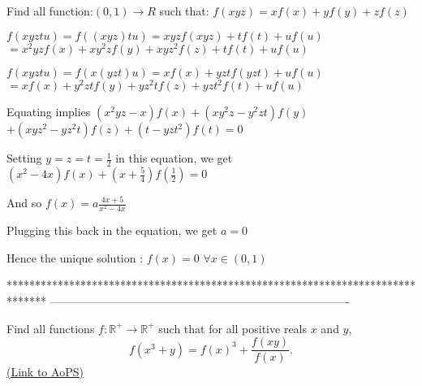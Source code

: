 \begin{solution}
	\begin{tcolorbox}Find all function:$ (0,1) \to R$ such that:
$ f(xyz) = xf(x) + yf(y) + zf(z)$\end{tcolorbox}

$ f(xyztu)=f((xyz)tu)=xyzf(xyz)+tf(t)+uf(u)$ $ =x^2yzf(x)+xy^2zf(y)+xyz^2f(z)+tf(t)+uf(u)$

$ f(xyztu)=f(x(yzt)u)=xf(x)+yztf(yzt)+uf(u)$ $ =xf(x)+y^2ztf(y)+yz^2tf(z)+yzt^2f(t)+uf(u)$

Equating implies $ (x^2yz-x)f(x)+(xy^2z-y^2zt)f(y)$ $ +(xyz^2-yz^2t)f(z)+(t-yzt^2)f(t)=0$

Setting $ y=z=t=\frac 12$ in this equation, we get $ (x^2-4x)f(x)+(x+\frac 54)f(\frac 12)=0$

And so $ f(x)=a\frac{4x+5}{x^2-4x}$

Plugging this back in the equation, we get $ a=0$

Hence the unique solution : $ f(x)=0$ $ \forall x\in(0,1)$
\end{solution}
*******************************************************************************
-------------------------------------------------------------------------------

\begin{problem}
	Find all functions $f: \mathbb R^{+} \to \mathbb R^{+}$ such that for all positive reals $x$ and $y$,
\[ f(x^3+y)=f(x)^3+\frac{f(xy)}{f(x)}.\]
	\flushright \href{https://artofproblemsolving.com/community/c6h318112}{(Link to AoPS)}
\end{problem}



